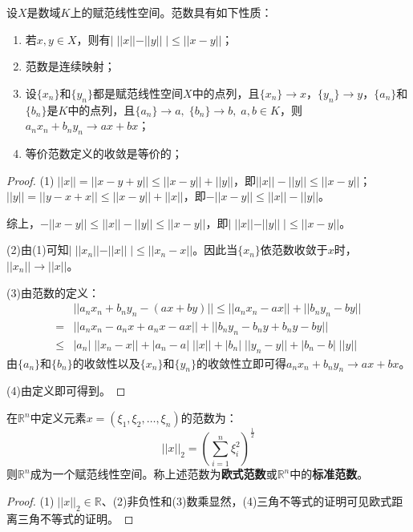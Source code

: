 \begin{property}\label{prop:Norm}
	设$X$是数域$K$上的赋范线性空间。范数具有如下性质：
	\begin{enumerate}
		\item 若$x,y\in X$，则有$|\;||x||-||y||\;|\leqslant||x-y||$；
		\item 范数是连续映射；
		\item 设$\{x_n\}$和$\{y_n\}$都是赋范线性空间$X$中的点列，且$\{x_n\}\rightarrow x$，$\{y_n\}\rightarrow y$，$\{a_n\}$和$\{b_n\}$是$K$中的点列，且$\{a_n\}\to a,\;\{b_n\}\to b,\;a,b\in K$，则$a_nx_n+b_ny_n\to ax+bx$；
		\item 等价范数定义的收敛是等价的；
	\end{enumerate}
\end{property}
\begin{proof}
	(1)$\;||x||=||x-y+y||\leqslant||x-y||+||y||$，即$||x||-||y||\leqslant||x-y||$；$||y||=||y-x+x||\leqslant||x-y||+||x||$，即$-||x-y||\leqslant||x||-||y||$。\par
	综上，$-||x-y||\leqslant||x||-||y||\leqslant||x-y||$，即$|\;||x||-||y||\;|\leqslant||x-y||$。\par
	(2)由(1)可知$|\;||x_n||-||x||\;|\leqslant||x_n-x||$。因此当$\{x_n\}$依范数收敛于$x$时，$||x_n||\to||x||$。\par
	(3)由范数的定义：
	\begin{align*}
		&||a_nx_n+b_ny_n-(ax+by)||\leqslant||a_nx_n-ax||+||b_ny_n-by|| \\
		=&||a_nx_n-a_nx+a_nx-ax||+||b_ny_n-b_ny+b_ny-by|| \\
		\leqslant&|a_n|\;||x_n-x||+|a_n-a|\;||x||+|b_n|\;||y_n-y||+|b_n-b|\;||y||
	\end{align*}
	由$\{a_n\}$和$\{b_n\}$的收敛性以及$\{x_n\}$和$\{y_n\}$的收敛性立即可得$a_nx_n+b_ny_n\to ax+bx$。\par
	(4)由定义即可得到。
\end{proof}
\begin{definition}
	在$\mathbb{R}^{n}$中定义元素$x=(\xi_1,\xi_2,\dots,\xi_n)$的范数为：
	\begin{equation*}
		||x||_2=\left(\sum_{i=1}^n\xi_i^2\right)^{\frac{1}{2}}
	\end{equation*}
	则$\mathbb{R}^{n}$成为一个赋范线性空间。称上述范数为\textbf{欧式范数}或$\mathbb{R}^{n}$中的\textbf{标准范数}。
\end{definition}
\begin{proof}
	(1)$\;||x||_2\in\mathbb{R}$、(2)非负性和(3)数乘显然，(4)三角不等式的证明可见欧式距离三角不等式的证明。
\end{proof}
